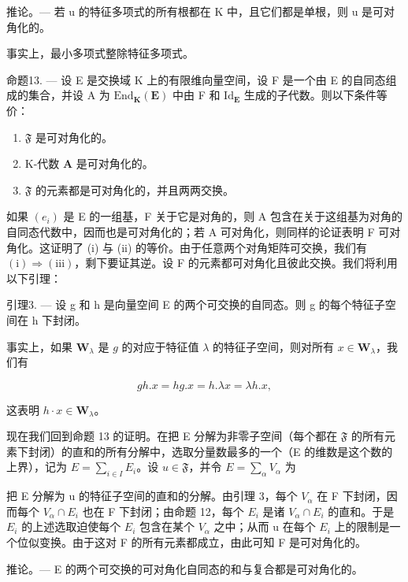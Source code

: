推论。--- 若 u 的特征多项式的所有根都在 K 中，且它们都是单根，则 u 是可对角化的。

事实上，最小多项式整除特征多项式。

命题13. --- 设 E 是交换域 K 上的有限维向量空间，设 F 是一个由 E 的自同态组成的集合，并设 A 为 \(\mathrm{End}_{\mathbf{K}}(\mathbf{E})\) 中由 F 和 \(\mathrm{Id}_{\mathbf{E}}\) 生成的子代数。则以下条件等价：

\begin{enumerate}
\def\labelenumi{(\roman{enumi})}
\item
  \(\mathfrak{F}\) 是可对角化的。
\item
  K-代数 \(\mathbf{A}\) 是可对角化的。
\item
  \(\mathfrak{F}\) 的元素都是可对角化的，并且两两交换。
\end{enumerate}

如果 \((e_{i})\) 是 E 的一组基，F 关于它是对角的，则 A 包含在关于这组基为对角的自同态代数中，因而也是可对角化的；若 A 可对角化，则同样的论证表明 F 可对角化。这证明了 (i) 与 (ii) 的等价。由于任意两个对角矩阵可交换，我们有 \((\mathrm{i}) \Rightarrow (\mathrm{iii})\)，剩下要证其逆。设 F 的元素都可对角化且彼此交换。我们将利用以下引理：

引理3. --- 设 g 和 h 是向量空间 E 的两个可交换的自同态。则 g 的每个特征子空间在 h 下封闭。

事实上，如果 \(\mathbf{W}_{\lambda}\) 是 \(g\) 的对应于特征值 \(\lambda\) 的特征子空间，则对所有 \(x \in \mathbf{W}_{\lambda}\)，我们有

\[
g h. x = h g. x = h. \lambda x = \lambda h. x,
\]

这表明 \(h \cdot x \in \mathbf{W}_{\lambda}\)。

现在我们回到命题 13 的证明。在把 E 分解为非零子空间（每个都在 \(\mathfrak{F}\) 的所有元素下封闭）的直和的所有分解中，选取分量数最多的一个（E 的维数是这个数的上界），记为 \(E = \sum_{i\in I}E_i\)。设 \(u\in \mathfrak{F}\)，并令 \(E = \sum_{\alpha}V_{\alpha}\) 为

把 E 分解为 u 的特征子空间的直和的分解。由引理 3，每个 \(V_{\alpha}\) 在 F 下封闭，因而每个 \(V_{\alpha} \cap E_{i}\) 也在 F 下封闭；由命题 12，每个 \(E_{i}\) 是诸 \(V_{\alpha} \cap E_{i}\) 的直和。于是 \(E_{i}\) 的上述选取迫使每个 \(E_{i}\) 包含在某个 \(V_{\alpha}\) 之中；从而 u 在每个 \(E_{i}\) 上的限制是一个位似变换。由于这对 F 的所有元素都成立，由此可知 F 是可对角化的。

推论。--- E 的两个可交换的可对角化自同态的和与复合都是可对角化的。

